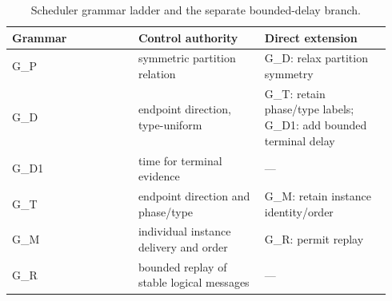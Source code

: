 \begin{table}[t]
\centering
\small
\begin{tabular}{p{0.313\linewidth}p{0.313\linewidth}p{0.313\linewidth}}
\toprule
Grammar & Control authority & Direct extension \\
\midrule
G\_P & symmetric partition relation & G\_D: relax partition symmetry \\
G\_D & endpoint direction, type-uniform & G\_T: retain phase/type labels; G\_D1: add bounded terminal delay \\
G\_D1 & time for terminal evidence & — \\
G\_T & endpoint direction and phase/type & G\_M: retain instance identity/order \\
G\_M & individual instance delivery and order & G\_R: permit replay \\
G\_R & bounded replay of stable logical messages & — \\
\bottomrule
\end{tabular}
\caption{Scheduler grammar ladder and the separate bounded-delay branch.}
\label{tab:table1_scheduler_grammars}
\end{table}
